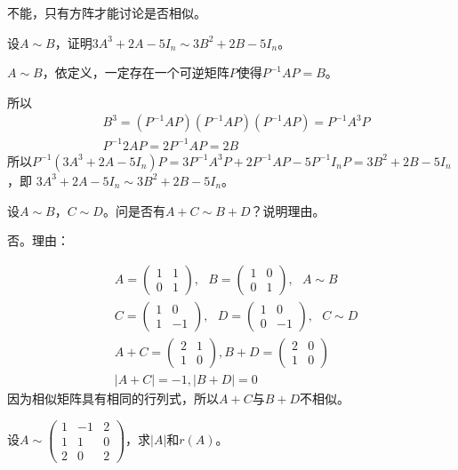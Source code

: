 \documentclass[a4paper]{report}
\begin{document}
\begin{jie}
不能，只有方阵才能讨论是否相似。
\end{jie}

\EX 设$A\sim B$，证明$3A^3+2A-5I_{n}\sim 3B^2+2B-5I_n$。

\begin{zhengming}
$A\sim B$，依定义，一定存在一个可逆矩阵$P$使得$P^{-1}AP=B$。

所以
\begin{align*}
&B^3=(P^{-1}AP)(P^{-1}AP)(P^{-1}AP)=P^{-1}A^3P\\
&P^{-1}2AP=2P^{-1}AP=2B
\end{align*}
所以$P^{-1}(3A^3+2A-5I_{n})P=3P^{-1}A^3P+2P^{-1}AP-5P^{-1}I_nP=3B^2+2B-5I_n$，即
$3A^3+2A-5I_{n}\sim 3B^2+2B-5I_n$。
\end{zhengming}

\EX 设$A\sim B$，$C\sim D$。问是否有$A+C\sim B+D$？说明理由。

\begin{jie}
否。理由：

\begin{align*}
&A=
\begin{pmatrix}
1&1\\ 0&1
\end{pmatrix},~~~B=
\begin{pmatrix}
1&0\\ 0&1
\end{pmatrix},~~~A\sim B\\
&C=
\begin{pmatrix}
1&0\\ 1&-1
\end{pmatrix},~~~D=
\begin{pmatrix}
1&0\\ 0&-1
\end{pmatrix},~~~C\sim D\\
& A+C=
\begin{pmatrix}
2&1\\ 1&0
\end{pmatrix},B+D=
\begin{pmatrix}
2&0\\
1&0
\end{pmatrix}\\
&|A+C|=-1,|B+D|=0
\end{align*}
因为相似矩阵具有相同的行列式，所以$A+C$与$B+D$不相似。
\end{jie}

\EX 设$A\sim
\begin{pmatrix}
1&-1&2\\
1&1&0\\
2&0&2
\end{pmatrix}
$，求$|A|$和$r(A)$。
\end{document}
